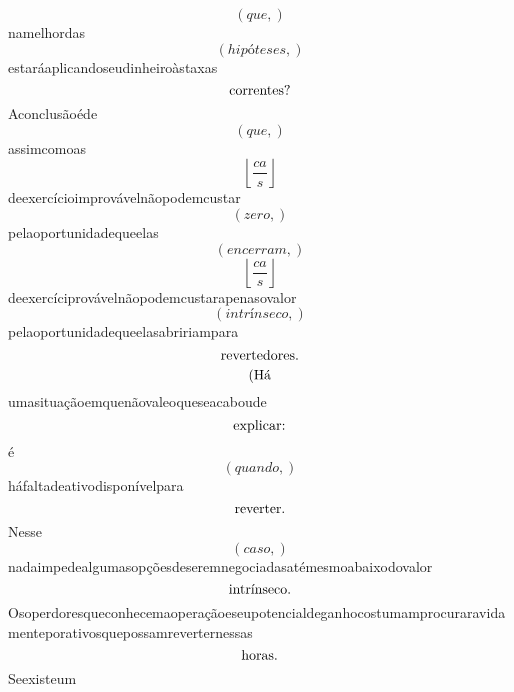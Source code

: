 \documentclass{article}
\begin{document}
\begin{equation}
\left( que,\right)
\end{equation}namelhordas\begin{equation}
\left( hipóteses,\right)
\end{equation}estaráaplicandoseudinheiroàstaxas\begin{equation}
$correntes?$
\end{equation}Aconclusãoéde\begin{equation}
\left( que,\right)
\end{equation}assimcomoas\begin{equation}
\left\lfloor{\frac{ca}{s}}\right\rfloor
\end{equation}deexercícioimprovávelnãopodemcustar\begin{equation}
\left( zero,\right)
\end{equation}pelaoportunidadequeelas\begin{equation}
\left( encerram,\right)
\end{equation}\begin{equation}
\left\lfloor{\frac{ca}{s}}\right\rfloor
\end{equation}deexercíciprovávelnãopodemcustarapenasovalor\begin{equation}
\left( intrínseco,\right)
\end{equation}pelaoportunidadequeelasabririampara\begin{equation}
$revertedores.$
\end{equation}\begin{equation}
$(Há$
\end{equation}umasituaçãoemquenãovaleoqueseacaboude\begin{equation}
$explicar:$
\end{equation}é\begin{equation}
\left( quando,\right)
\end{equation}háfaltadeativodisponívelpara\begin{equation}
$reverter.$
\end{equation}Nesse\begin{equation}
\left( caso,\right)
\end{equation}nadaimpedealgumasopçõesdeseremnegociadasatémesmoabaixodovalor\begin{equation}
$intrínseco.$
\end{equation}Osoperdoresqueconhecemaoperaçãoeseupotencialdeganhocostumamprocuraravidamenteporativosquepossamreverternessas\begin{equation}
$horas.$
\end{equation}Seexisteum\begin{equation}

\end{equation}
\end{document}
